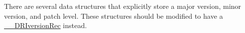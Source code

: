 
\begin{DoxyRefList}
\item[\label{todo__todo000001}%
\Hypertarget{todo__todo000001}%
Class \hyperlink{struct_____d_r_iversion_rec}{\+\_\+\+\_\+\+D\+R\+Iversion\+Rec} ]There are several data structures that explicitly store a major version, minor version, and patch level. These structures should be modified to have a {\ttfamily \hyperlink{struct_____d_r_iversion_rec}{\+\_\+\+\_\+\+D\+R\+Iversion\+Rec}} instead. 
\end{DoxyRefList}